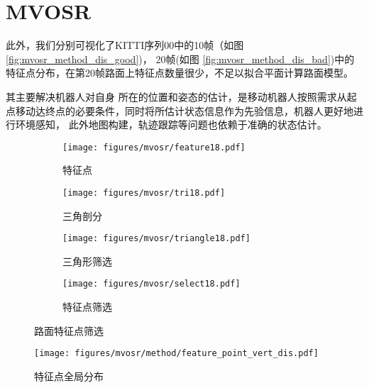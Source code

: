 \section{MVOSR}
此外，我们分别可视化了KITTI序列00中的10帧（如图\ref{fig:mvosr_method_dis_good})，
20帧(如图 \ref{fig:mvosr_method_dis_bad})中的特征点分布，在第20帧路面上特征点数量很少，不足以拟合平面计算路面模型。

其主要解决机器人对自身
所在的位置和姿态的估计，是移动机器人按照需求从起点移动达终点的必要条件，同时将所估计状态信息作为先验信息，机器人更好地进行环境感知，
此外地图构建，轨迹跟踪等问题也依赖于准确的状态估计。
\begin{figure}
    \centering
    \begin{subfigure}[b]{0.45\textwidth}
    \texttt{[image: figures/mvosr/feature18.pdf]}
    
    \caption{特征点}
    \label{fig:mvosr_feature}
    \end{subfigure}
    \begin{subfigure}[b]{0.45\textwidth}
    \texttt{[image: figures/mvosr/tri18.pdf]}
    
    \caption{三角剖分}
    \label{fig:mvosr_tri}
    \end{subfigure}
    \begin{subfigure}[b]{0.45\textwidth}
    \texttt{[image: figures/mvosr/triangle18.pdf]}
   
    \caption{三角形筛选}
    \label{fig:mvosr_triangle}
    \end{subfigure}
    \begin{subfigure}[b]{0.45\textwidth}
        \texttt{[image: figures/mvosr/select18.pdf]}
        
        \caption{特征点筛选}
        \label{fig:mvosr_selected}
        \end{subfigure}
    \caption{路面特征点筛选}
    \label{fig:mvosr_road_feature}
    \end{figure}

    \begin{figure}
        \centering
        \texttt{[image: figures/mvosr/method/feature\_point\_vert\_dis.pdf]}
    
        \caption{特征点全局分布}
        \label{fig:mvosr_method_vert_dis}
    \end{figure}
    
